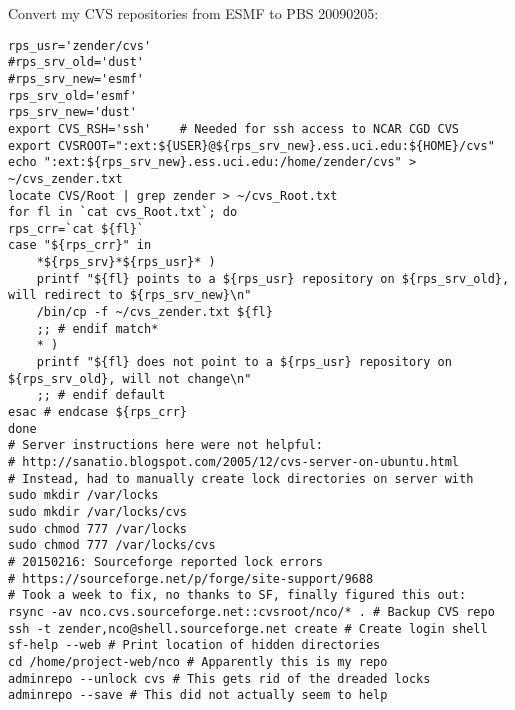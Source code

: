 \documentclass[12pt,twoside]{article}
\begin{document}
Convert my CVS repositories from ESMF to PBS 20090205:
\begin{verbatim}
rps_usr='zender/cvs'
#rps_srv_old='dust'
#rps_srv_new='esmf'
rps_srv_old='esmf'
rps_srv_new='dust'
export CVS_RSH='ssh'    # Needed for ssh access to NCAR CGD CVS
export CVSROOT=":ext:${USER}@${rps_srv_new}.ess.uci.edu:${HOME}/cvs"
echo ":ext:${rps_srv_new}.ess.uci.edu:/home/zender/cvs" > ~/cvs_zender.txt
locate CVS/Root | grep zender > ~/cvs_Root.txt
for fl in `cat cvs_Root.txt`; do
rps_crr=`cat ${fl}`
case "${rps_crr}" in 
    *${rps_srv}*${rps_usr}* ) 
    printf "${fl} points to a ${rps_usr} repository on ${rps_srv_old}, will redirect to ${rps_srv_new}\n"
    /bin/cp -f ~/cvs_zender.txt ${fl}
    ;; # endif match*
    * )
    printf "${fl} does not point to a ${rps_usr} repository on ${rps_srv_old}, will not change\n"
    ;; # endif default
esac # endcase ${rps_crr}
done
# Server instructions here were not helpful:
# http://sanatio.blogspot.com/2005/12/cvs-server-on-ubuntu.html
# Instead, had to manually create lock directories on server with
sudo mkdir /var/locks
sudo mkdir /var/locks/cvs
sudo chmod 777 /var/locks
sudo chmod 777 /var/locks/cvs
# 20150216: Sourceforge reported lock errors
# https://sourceforge.net/p/forge/site-support/9688
# Took a week to fix, no thanks to SF, finally figured this out:
rsync -av nco.cvs.sourceforge.net::cvsroot/nco/* . # Backup CVS repo
ssh -t zender,nco@shell.sourceforge.net create # Create login shell
sf-help --web # Print location of hidden directories
cd /home/project-web/nco # Apparently this is my repo
adminrepo --unlock cvs # This gets rid of the dreaded locks
adminrepo --save # This did not actually seem to help
\end{verbatim}
\end{document}

